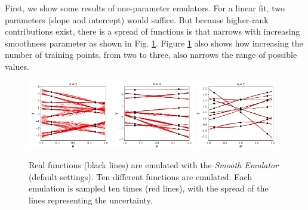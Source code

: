 \documentclass[main.tex]{subfiles}
\begin{document}
First, we show some results of one-parameter emulators. For a linear fit, two parameters (slope and intercept) would suffice. But because higher-rank contributions exist, there is a spread of functions is that narrows with increasing smoothness parameter as shown in Fig. \ref{fig:onedim}. Figure \ref{fig:onedim} also shows how increasing the number of training points, from two to three, also narrows the range of possible values. 
\begin{figure}
\includegraphics[width=0.32\textwidth]{onepar2points/onepartest_Lambda2}\hspace*{0.02\textwidth}
\includegraphics[width=0.32\textwidth]{onepar2points/onepartest_Lambda4}\hspace*{0.02\textwidth}
\includegraphics[width=0.32\textwidth]{onepar3points/onepartest_Lambda2}
\caption{\label{fig:onedim}
Real functions (black lines) are emulated with the {\it Smooth Emulator} (default settings). Ten different functions are emulated. Each emulation is sampled ten times (red lines), with the spread of the lines representing the uncertainty.}
\end{figure}
\end{document}
